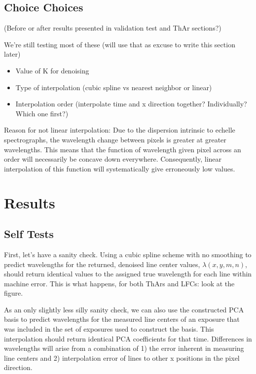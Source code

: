 \documentclass[12pt, letterpaper]{article}
\begin{document}
\subsection{Choice Choices} \label{sec:choices}
(Before or after results presented in validation test and ThAr sections?)

We're still testing most of these (will use that as excuse to write this section later)
\begin{itemize}
	\item Value of K for denoising
	\item Type of interpolation (cubic spline vs nearest neighbor or linear)
	\item Interpolation order (interpolate time and x direction together?  Individually?  Which one first?)
\end{itemize}

Reason for not linear interpolation:
Due to the dispersion intrinsic to echelle spectrographs, the wavelength change between pixels is greater at greater wavelengths.  This means that the function of wavelength given pixel across an order will necessarily be concave down everywhere.  Consequently, linear interpolation of this function will systematically give erroneously low values.


\section{Results} \label{sec:results}
\subsection{Self Tests} \label{sec:test-self}
First, let's have a sanity check.  Using a cubic spline scheme with no smoothing to predict wavelengths for the returned, denoised line center values, $\lambda(x,y,m,n)$, should return identical values to the assigned true wavelength for each line within machine error.
This is what happens, for both ThArs and LFCs: look at the figure.

As an only slightly less silly sanity check, we can also use the constructed PCA basis to predict wavelengths for the measured line centers of an exposure that was included in the set of exposures used to construct the basis.  This interpolation should return identical PCA coefficients for that time.  Differences in wavelengths will arise from a combination of 1) the error inherent in measuring line centers and 2) interpolation error of lines to other x positions in the pixel direction.
\end{document}
